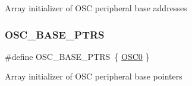 Array initializer of O\+SC peripheral base addresses \mbox{\label{group___o_s_c___peripheral___access___layer_ga46f69fcb9d660e18b5cbf51adbbcec78}} 
\subsubsection{\texorpdfstring{OSC\_BASE\_PTRS}{OSC\_BASE\_PTRS}}
{\footnotesize\ttfamily \#define O\+S\+C\+\_\+\+B\+A\+S\+E\+\_\+\+P\+T\+RS~\{ \mbox{\hyperlink{group___o_s_c___peripheral___access___layer_gafcf06a8b76107b94e802b4db254e8bbc}{O\+S\+C0}} \}}

Array initializer of O\+SC peripheral base pointers 
